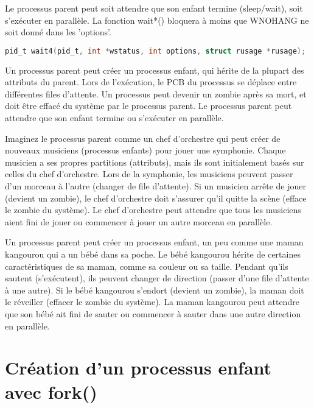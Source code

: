 \documentclass[12pt]{report}
\begin{document}
Le processus parent peut soit attendre que son enfant termine (sleep/wait), soit s'exécuter en parallèle. La fonction wait*() bloquera à moins que WNOHANG ne soit donné dans les 'options'.
\begin{lstlisting}[language=C]
pid_t wait4(pid_t, int *wstatus, int options, struct rusage *rusage);
\end{lstlisting}
\begin{tcolorbox}[colback=yellow!5, colframe=yellow!80!black, title={\faBookmark À retenir}]
Un processus parent peut créer un processus enfant, qui hérite de la plupart des attributs du parent. Lors de l'exécution, le PCB du processus se déplace entre différentes files d'attente. Un processus peut devenir un zombie après sa mort, et doit être effacé du système par le processus parent. Le processus parent peut attendre que son enfant termine ou s'exécuter en parallèle.
\end{tcolorbox}
\begin{tcolorbox}[colback=green!5, colframe=green!75!black, title={\faLightbulb Intuition}]
Imaginez le processus parent comme un chef d'orchestre qui peut créer de nouveaux musiciens (processus enfants) pour jouer une symphonie. Chaque musicien a ses propres partitions (attributs), mais ils sont initialement basés sur celles du chef d'orchestre. Lors de la symphonie, les musiciens peuvent passer d'un morceau à l'autre (changer de file d'attente). Si un musicien arrête de jouer (devient un zombie), le chef d'orchestre doit s'assurer qu'il quitte la scène (efface le zombie du système). Le chef d'orchestre peut attendre que tous les musiciens aient fini de jouer ou commencer à jouer un autre morceau en parallèle.
\end{tcolorbox}
\begin{tcolorbox}[colback=blue!5, colframe=blue!75!black, title={\faLightbulb Vulgarisation simple}]
Un processus parent peut créer un processus enfant, un peu comme une maman kangourou qui a un bébé dans sa poche. Le bébé kangourou hérite de certaines caractéristiques de sa maman, comme sa couleur ou sa taille. Pendant qu'ils sautent (s'exécutent), ils peuvent changer de direction (passer d'une file d'attente à une autre). Si le bébé kangourou s'endort (devient un zombie), la maman doit le réveiller (effacer le zombie du système). La maman kangourou peut attendre que son bébé ait fini de sauter ou commencer à sauter dans une autre direction en parallèle.
\end{tcolorbox}

\section{Création d'un processus enfant avec fork()} 
\end{document}
